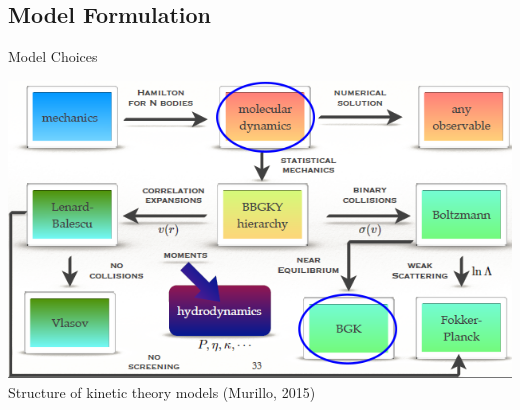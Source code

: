 \documentclass{beamer}
\begin{document}
	\subsection{Model Formulation}
	\begin{frame}{Model Choices}
		\begin{center}
			\includegraphics[width=1\textwidth]{KT_structure.png}
			\\\tiny Structure of kinetic theory models (Murillo, 2015)
		\end{center}
		
	\end{frame}
	
	
\end{document}
